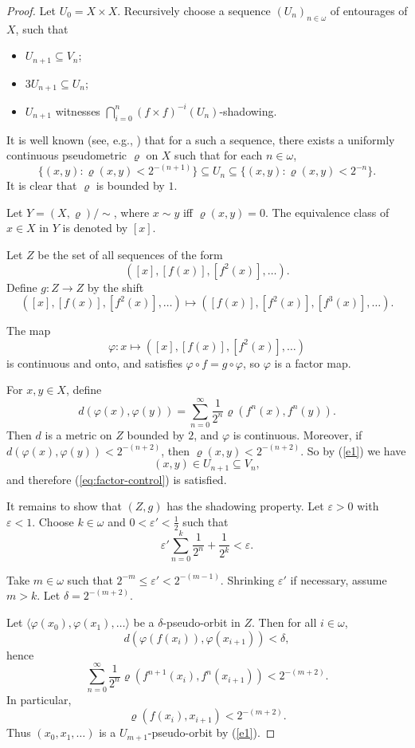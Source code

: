 \documentclass[12pt]{amsart}
\theoremstyle{definition}
\numberwithin{equation}{section}
\theoremstyle{remark}
\begin{document}
\begin{proof}
Let $U_0=X\times X$. 
Recursively choose a sequence $(U_n)_{n\in \omega}$ of entourages of $X$, such that 
\begin{itemize}
\item $U_{n+1}\subseteq V_n$;
\item $3U_{n+1}\subseteq {U_n}$;
\item $U_{n+1}$ witnesses $\bigcap_{i=0}^n (f\times f)^{-i}(U_n)$-shadowing.
\end{itemize}

It is well known (see, e.g., \cite[Theorem 8.1.10]{Eng}) that for a such a sequence, there exists a uniformly continuous pseudometric $\varrho$ on $X$ such that for each $n\in \omega$,
\begin{equation}\label{e1}
\{(x,y):\varrho(x,y)<2^{-(n+1)}\}
\subseteq U_n
\subseteq \{(x,y):\varrho(x,y)<2^{-n}\}.
\end{equation}
It is clear that $\varrho$ is bounded by $1$.

Let $Y=(X,\varrho)/\sim$, where $x\sim y$ iff $\varrho(x,y)=0$. The equivalence class of $x\in X$ in $Y$ is denoted by $[x]$.

Let $Z$ be the set of all sequences of the form
\[
( [x],[f(x)],[f^2(x)],\ldots).
\]
Define $g:Z\to Z$ by the shift
\[
([x],[f(x)],[f^2(x)],\ldots)
\mapsto
([f(x)],[f^2(x)],[f^3(x)],\ldots).
\]

The map
\[
\varphi:x\mapsto ( [x],[f(x)],[f^2(x)],\ldots)
\]
is continuous and onto, and satisfies $\varphi\circ f=g\circ \varphi$, 
so $\varphi$ is a factor map.

For $x,y\in X$, define
\[
d(\varphi(x),\varphi(y))
=\sum_{n=0}^\infty \frac{1}{2^n}\varrho(f^n(x),f^n(y)).
\]
Then $d$ is a metric on $Z$ bounded by $2$, and $\varphi$ is continuous.
Moreover, if $d(\varphi(x), \varphi(y))<2^{-(n+2)}$, then $\varrho(x, y)<2^{-(n+2)}$. So by (\ref{e1}) we have 
\[(x, y)\in U_{n+1}\subseteq V_n,\]
 and therefore (\ref{eq:factor-control}) is satisfied.

It remains to show that $(Z,g)$ has the shadowing property. 
Let $\varepsilon>0$ with $\varepsilon<1$. 
Choose $k\in \omega$ and $0<\varepsilon'<\tfrac{1}{2}$ such that
\[
\varepsilon'\sum_{n=0}^k \frac{1}{2^n}+\frac{1}{2^k}<\varepsilon.
\]

Take $m\in \omega$ such that $2^{-m}\le \varepsilon'<2^{-(m-1)}$. 
Shrinking $\varepsilon'$ if necessary, assume $m>k$. 
Let 
$
\delta=2^{-(m+2)}.
$

Let $\langle \varphi(x_0),\varphi(x_1),\ldots\rangle$ be a $\delta$-pseudo-orbit in $Z$. 
Then for all $i\in \omega$,
\[
d(\varphi(f(x_i)),\varphi(x_{i+1}))<\delta,
\]
hence
\[
\sum_{n=0}^\infty \frac{1}{2^n}\varrho(f^{n+1}(x_i),f^n(x_{i+1}))<2^{-(m+2)}.
\]
In particular,
\[
\varrho(f(x_i),x_{i+1})<2^{-(m+2)}.
\]
Thus $(x_0,x_1,\ldots)$ is a $U_{m+1}$-pseudo-orbit by (\ref{e1}).


\end{proof}
\end{document}
